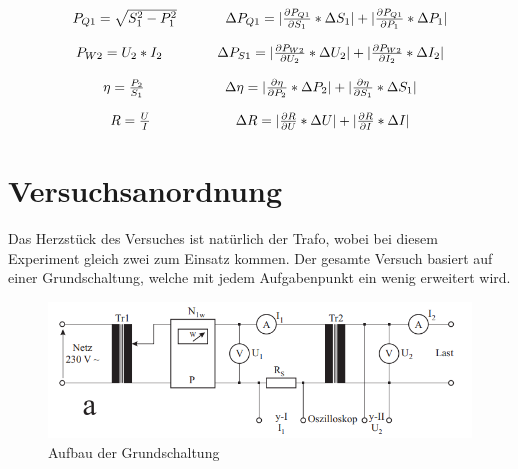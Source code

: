 \documentclass[12pt,a4paper,twoside]{article}
\begin{document}
\begin{equation}
    \label{eq:Blindleistung}
    \centerline{$P_{Q1} = \sqrt{S_{1}^2 - P_{1}^2}$ \\ $\Delta P_{Q1} = \vert \frac{\partial P_{Q1}}{\partial S_{1}} * \Delta S_{1} \vert + \vert \frac{\partial P_{Q1}}{\partial P_{1}} * \Delta P_{1} \vert $}
\end{equation}

\begin{equation}
    \label{eq:Wirkleistung}
    \centerline{$P_{W2} = U_{2}*I_{2}$ \\ $\Delta P_{S1} = \vert \frac{\partial P_{W2}}{\partial U_{2}} * \Delta U_{2} \vert + \vert \frac{\partial P_{W2}}{\partial I_{2}} * \Delta I_{2} \vert $}
\end{equation}

\begin{equation}
    \label{eq:Wirkungsgrad}
    \centerline{$\eta = \frac{P_{2}}{S_{1}}$ \\ $\Delta \eta = \vert \frac{\partial \eta}{\partial P_{2}} * \Delta P_{2} \vert + \vert \frac{\partial \eta}{\partial S_{1}} * \Delta S_{1} \vert $}
\end{equation}

\begin{equation}
    \label{eq:OhmschesGesetz}
    \centerline{$R = \frac{U}{I}$ \\ $\Delta R = \vert \frac{\partial R}{\partial U} * \Delta U \vert + \vert \frac{\partial R}{\partial I} * \Delta I \vert $}
\end{equation}


\section{Versuchsanordnung} %

Das Herzstück des Versuches ist natürlich der Trafo, wobei bei diesem Experiment gleich zwei zum Einsatz kommen. Der gesamte Versuch basiert auf einer Grundschaltung, welche mit jedem Aufgabenpunkt ein wenig erweitert wird.

    \begin{figure}[H]
        \centering
        \includegraphics[width=0.6\linewidth, angle=0]{nudes/Versuchsaufbau a.png}
        \caption{Aufbau der Grundschaltung}
        \label{fig:AufbauDerGrundschaltung}
    \end{figure}
\end{document}
